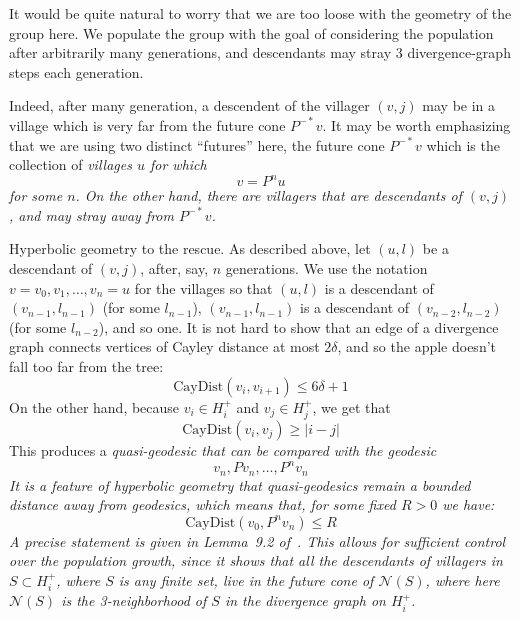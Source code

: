 \documentclass[12pt,reqno]{amsart}
\theoremstyle{plain}
\theoremstyle{definition}
\numberwithin{subcase}{case}
\theoremstyle{plain}
\theoremstyle{definition}
\begin{document}
It would be quite natural to worry that we are too loose with the geometry of the group here. We populate the group with the goal of considering the population after arbitrarily many generations, and descendants may stray 3 divergence-graph steps each generation. 


Indeed, after many generation, a descendent of the villager \((v,j)\) may be in a village which is very far from the future cone \(P^{-*}v\). It may be worth emphasizing that we are using two distinct ``futures'' here, the future cone \(P^{-*}v\) which is the collection of \em villages \em \(u\) for which
\[
v = P^{n}u
\]
for some \(n\). On the other hand, there are \em villagers \em that are descendants of  \((v,j)\), and may stray away from \(P^{-*}v\).  

Hyperbolic geometry to the rescue. As described above, let \((u,l)\) be a descendant of \((v,j)\), after, say, \(n\) generations. We use the notation \(v=v_{0},v_1, \dots, v_{n}=u\) for the villages so that \((u,l)\) is a descendant of \((v_{n-1},l_{n-1})\) (for some \(l_{n-1}\)), \((v_{n-1},l_{n-1})\) is a descendant of \((v_{n-2},l_{n-2})\) (for some \(l_{n-2}\)), and so one. It is not hard to show that an edge of a divergence graph connects vertices of Cayley distance at most \(2\delta\), and so the apple doesn't fall too far from the tree:
\[
\mathrm{CayDist}(v_{i},v_{i+1}) \leq 6\delta + 1
\]
On the other hand, because \(v_{i} \in H^{+}_{i}\) and \(v_{j} \in H^{+}_{j}\), we get that
\[
\mathrm{CayDist}(v_{i},v_{j}) \geq |i-j|
\]
This produces a \em quasi-geodesic \em that can be compared with the geodesic
\[
v_{n},Pv_{n},\dots,P^{n}v_{n}
\]
It is a feature of hyperbolic geometry that quasi-geodesics remain a bounded distance away from geodesics, which means that, for some fixed \(R>0\) we have:
\[
\mathrm{CayDist}(v_{0},P^{n}v_{n}) \leq R
\]
A precise statement is given in Lemma~9.2 of~\cite{cohen_goodman-strauss_rieck_2021}. This allows for sufficient control over the population growth, since it shows that all the descendants of villagers in \(S \subset H^{+}_{i}\), where \(S\) is any finite set, live in the future cone of \(\mathcal{N}(S)\), where here \(\mathcal{N}(S)\) is the 3-neighborhood of \(S\) in the divergence graph on \(H^{+}_{i}\).
\end{document}
